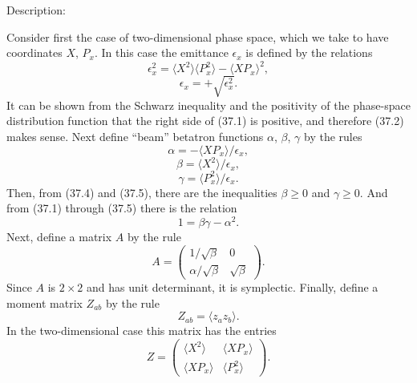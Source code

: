 \vspace{5mm}
Description:
\vspace{2mm}

Consider first the case of two-dimensional phase space, which we take to have coordinates $X$, $P_x$.  In this case the emittance $\epsilon_x$ is defined by the relations
\begin{equation}
\epsilon^2_x = \langle X^2\rangle \langle P^2_x\rangle - \langle XP_x\rangle^2,
\end{equation}
\begin{equation}
\epsilon_x = +\sqrt{\epsilon^2_x}.
\end{equation}
It can be shown from the Schwarz inequality and the positivity of the phase-space distribution function that the right side of (37.1) is positive, and therefore (37.2) makes sense.  Next define ``beam'' betatron functions $\alpha$, $\beta$, $\gamma$ by the rules 
\begin{equation}
\alpha = - \langle XP_x\rangle /\epsilon_x,
\end{equation}
\begin{equation}
\beta = \langle X^2\rangle /\epsilon_x,
\end{equation}
\begin{equation}
\gamma = \langle P^2_x\rangle /\epsilon_x.
\end{equation}
Then, from (37.4) and (37.5), there are the inequalities $\beta \geq 0$ and $\gamma \geq 0$.  And from (37.1) through (37.5) there is the relation
\begin{equation}
1 = \beta \gamma - \alpha^2.
\end{equation}
Next, define a matrix $A$ by the rule
\begin{equation}
A = \left( \begin{array}{cc} 1/\sqrt{\beta} & 0 \\
\alpha /\sqrt{\beta} & \sqrt{\beta}\end{array}\right).
\end{equation}
Since $A$ is $2 \times 2$ and has unit determinant, it is symplectic.  Finally, define a moment matrix $Z_{ab}$ by the rule
\begin{equation}
Z_{ab} = \langle z_az_b\rangle .
\end{equation}
In the two-dimensional case this matrix has the entries
\begin{equation}
Z =  \left( \begin{array}{cc} \langle X^2\rangle & \langle XP_x\rangle \\
\langle XP_x\rangle & \langle P_x^2\rangle \end{array}\right).
\end{equation}
